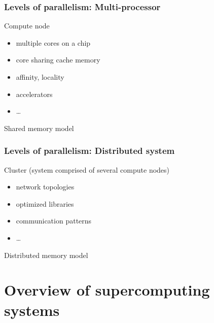\begin{frame}
  \frametitle{Levels of parallelism: Multi-processor}

Compute node
\begin{itemize}
\item multiple cores on a chip
\item core sharing cache memory
\item affinity, locality
\item accelerators
\item \dots
\end{itemize}
\begin{center}
Shared memory model
\end{center}

\end{frame}

\begin{frame}
  \frametitle{Levels of parallelism: Distributed system}


Cluster (system comprised of several compute nodes)
\begin{itemize}
\item network topologies
\item optimized libraries
\item communication patterns
\item \dots
\end{itemize}
\begin{center}
Distributed memory model
\end{center}

\end{frame}

\section{Overview of supercomputing systems}

